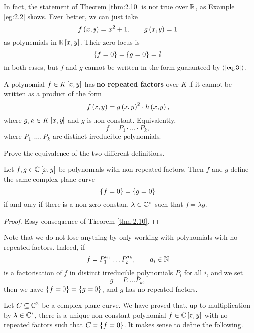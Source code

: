 \begin{remark}
In fact, the statement of Theorem \ref{thm:2.10} is not true over $ \R $, as Example \ref{eg:2.2} shows. Even better, we can just take
$$ f\rb{x, y} = x^2 + 1, \qquad g\rb{x, y} = 1 $$
as polynomials in $ \R\sb{x, y} $. Their zero locus is
$$ \cb{f = 0} = \cb{g = 0} = \emptyset $$
in both cases, but $ f $ and $ g $ cannot be written in the form guaranteed by $ \rb{\ref{eq:3}} $.
\end{remark}

\begin{definition}
A polynomial $ f \in K\sb{x, y} $ has \textbf{no repeated factors} over $ K $ if it cannot be written as a product of the form
$$ f\rb{x, y} = g\rb{x, y}^2 \cdot h\rb{x, y}, $$
where $ g, h \in K\sb{x, y} $ and $ g $ is non-constant. Equivalently,
$$ f = P_1 \cdot \dots \cdot P_k, $$
where $ P_1, \dots, P_k $ are distinct irreducible polynomials.
\end{definition}

\begin{exercise}
Prove the equivalence of the two different definitions.
\end{exercise}

\begin{corollary}
Let $ f, g \in \C\sb{x, y} $ be polynomials with non-repeated factors. Then $ f $ and $ g $ define the same complex plane curve
$$ \cb{f = 0} = \cb{g = 0} $$
if and only if there is a non-zero constant $ \lambda \in \C^* $ such that $ f = \lambda g $.
\end{corollary}

\begin{proof}
Easy consequence of Theorem \ref{thm:2.10}.
\end{proof}

\begin{remark}
Note that we do not lose anything by only working with polynomials with no repeated factors. Indeed, if
$$ f = P_1^{a_1} \dots P_k^{a_k}, \qquad a_i \in \N $$
is a factorisation of $ f $ in distinct irreducible polynomials $ P_i $ for all $ i $, and we set
$$ g = P_1 \dots P_k, $$
then we have $ \cb{f = 0} = \cb{g = 0} $, and $ g $ has no repeated factors.
\end{remark}

\pagebreak

Let $ C \subseteq \C^2 $ be a complex plane curve. We have proved that, up to multiplication by $ \lambda \in \C^* $, there is a unique non-constant polynomial $ f \in \C\sb{x, y} $ with no repeated factors such that $ C = \cb{f = 0} $. It makes sense to define the following.

